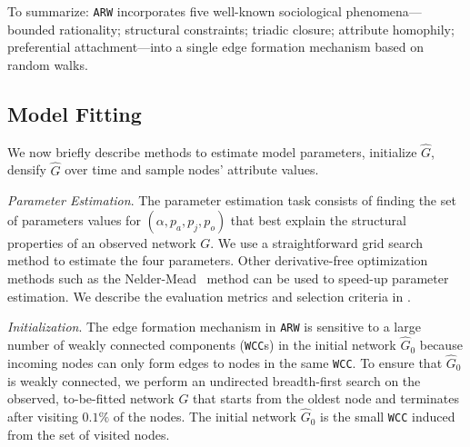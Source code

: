 To summarize: \texttt{ARW} incorporates five well-known sociological
phenomena--- bounded rationality; structural constraints; triadic closure;
attribute homophily; preferential attachment---into a single edge formation
mechanism based on random walks.




\subsection{Model Fitting}
\label{sub:Model Fitting}

We now briefly describe methods to estimate model parameters,
initialize $\hat{G}$, densify $\hat{G}$ over time and sample nodes' attribute values.

\textit{Parameter Estimation}.
The parameter estimation task consists of finding the set of parameters values
for $(\alpha, p_a, p_j, p_o)$ that best explain the structural properties of an
observed network $G$. We use a straightforward grid search method to estimate
the four parameters. Other derivative-free optimization methods such as the
Nelder-Mead~\cite{nelder1965simplex} method can be used to speed-up parameter
estimation. We describe the evaluation metrics and selection criteria in
.

\textit{Initialization}. The edge formation mechanism in \texttt{ARW} is
sensitive to a large number of weakly connected components (\texttt{WCC}s) in the
initial network $\hat{G}_0$ because incoming nodes can only form edges to nodes
in the same \texttt{WCC}. To ensure that $\hat{G}_0$ is weakly
connected, we perform an undirected breadth-first search on the observed,
to-be-fitted network $G$ that starts from the oldest node and terminates after
visiting $0.1\%$ of the nodes. The initial network $\hat{G}_0$ is the small \texttt{WCC}
induced from the set of visited nodes.


